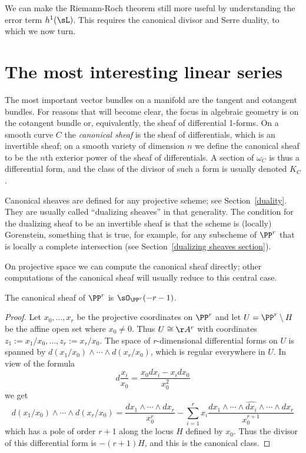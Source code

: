 We can make the Riemann-Roch theorem still more useful by understanding the error term $h^1(\sL)$. This requires
the canonical divisor and Serre duality, to which
we now turn.


\section{The most interesting linear series}\label{most interesting}

The most important vector bundles on a manifold are the tangent and cotangent bundles. For reasons that
will become clear, the focus in algebraic geometry is on the cotangent bundle or, equivalently, the sheaf of differential 1-forms. On a smooth curve $C$ the \emph{canonical sheaf} is the sheaf of differentials, which is an 
invertible sheaf; on a smooth
variety of dimension $n$ we define the canonical sheaf to be the $n$th exterior power of the sheaf of differentials. A section of 
$\omega_C$ is thus a differential form, and the class of the divisor
of such a form is usually denoted $K_C$. 

\begin{fact}
Canonical sheaves are defined for any projective scheme; see Section~\ref{duality}. 
They are usually called ``dualizing sheaves'' in that generality. The condition for the dualizing sheaf to be an invertible
sheaf is that the scheme is (locally) Gorenstein, something that is true, for example, for any subscheme of $\PP^r$
that is locally a complete intersection (see Section~\ref{dualizing sheaves section}).
\end{fact}
 

On projective space we can compute the canonical sheaf directly; other computations of the canonical sheaf will usually reduce to this central case.

\begin{theorem}
 The canonical sheaf of $\PP^{r}$ is $\sO_{\PP^{r}}(-r-1)$. 
\end{theorem}
\begin{proof}
Let $x_{0}, \dots, x_{r}$ be the projective coordinates on $\PP^{r}$ and let  $U = \PP^{r}\setminus H$ be the affine open set where $x_{0} \neq 0$. Thus $U \cong \AA^{r}$ with coordinates $z_{1} := x_{1}/x_{0}, \dots, z_{r}:=x_{r}/x_{0}$. The space of $r$-dimensional differential forms on $U$ is spanned by $d(x_{1}/x_{0})\wedge\cdots\wedge d(x_{r}/x_{0})$, which is regular everywhere in $U$. In view of the formula
$$
d\frac{x_{i}}{x_{0}} = \frac{x_{0}dx_{i}-x_{i}dx_{0}}{x_{0}^{2}}
$$
we get
$$
d(x_{1}/x_{0})\wedge\cdots\wedge d(x_{r}/x_{0}) = \frac{dx_{1}\wedge\cdots\wedge dx_{r}}{x_{0}^{r}}-
\sum_{i=1}^{r} x_{i} \frac{ dx_{1}\wedge\cdots \wedge \widehat{dx_{i}}\wedge \cdots \wedge dx_{r}}{x_{0}^{r+1}}
$$
which has a pole of order $r+1$ along the locus $H$ defined by $x_{0}$. Thus the divisor of this differential form
is $-(r+1)H$, and this is the canonical class.
\end{proof}

